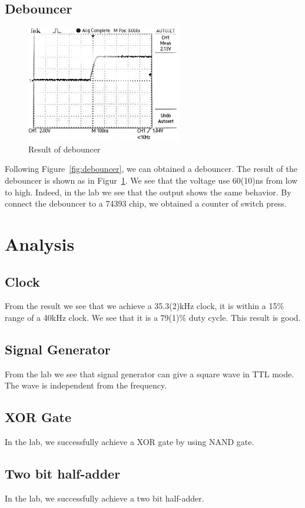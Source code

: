 \documentclass[aps,prl,reprint]{revtex4-1}
\begin{document}
    \subsection{Debouncer}
        \begin{figure}[h]
            \centering
            \includegraphics[height=2in]{image/debouncer-lab.pdf}
            \caption{Result of debouncer}
            \label{fig:debouncerLab}
        \end{figure}
        Following Figure~\ref{fig:debouncer}, we can obtained a debouncer. The result of the debouncer is shown as in Figur~\ref{fig:debouncerLab}. We see that the voltage use 60(10)ns from low to high. Indeed, in the lab we see that the output shows the same behavior. By connect the debouncer to a 74393 chip, we obtained a counter of switch press.
\section{Analysis}
    \subsection{Clock}
        From the result we see that we achieve a 35.3(2)kHz clock, it is within a 15\% range of a 40kHz clock. We see that it is a 79(1)\% duty cycle. This result is good.
    \subsection{Signal Generator}
        From the lab we see that signal generator can give a square wave in TTL mode. The wave is independent from the frequency.
    \subsection{XOR Gate}
        In the lab, we successfully achieve a XOR gate by using NAND gate.
    \subsection{Two bit half-adder}
        In the lab, we successfully achieve a two bit half-adder.
\end{document}
